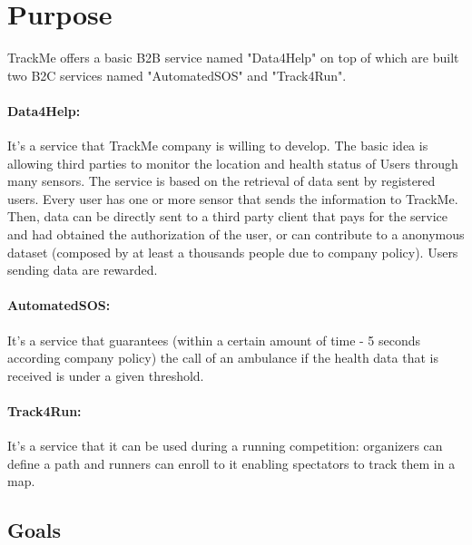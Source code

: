 \documentclass[../../rasd.tex]{subfiles}
\begin{document}
\section{Purpose}
			TrackMe offers a basic B2B service named "Data4Help" on top of which are built two B2C services named "AutomatedSOS" and "Track4Run".
			\paragraph{Data4Help:}It's a service that TrackMe company is willing to develop. The basic idea is allowing third parties to monitor the location and health status of Users through many sensors. The service is based on the retrieval of data sent by registered users. Every user has one or more sensor that sends the information to TrackMe. Then, data can be directly sent to a third party client that pays for the service and had obtained the authorization of the user, or can contribute to a anonymous dataset (composed by at least a thousands people due to company policy). Users sending data are rewarded.\\
			
			\paragraph{AutomatedSOS:}It's a service that guarantees (within a certain amount of time - 5 seconds according company policy) the call of an ambulance if the health data that is received is under a given threshold.
			
			\paragraph{Track4Run:}It's a service that it can be used during a running competition: organizers can define a path and runners can enroll to it enabling spectators to track them in a map.
			\subsection{Goals}
\end{document}
